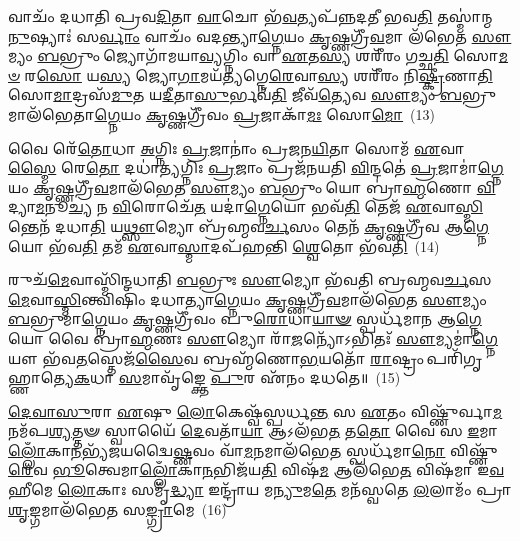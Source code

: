 𑌵𑌾𑌚𑌂᳴ 𑌦𑌧𑌾𑌤𑌿 𑌪𑍍𑌰𑌵\-\ul{𑌦𑌿}\-𑌤𑌾 \ul{𑌵𑌾}\-𑌚𑍋 𑌭᳴\-\ul{𑌵}\-𑌤𑍍𑌯𑌪᳴𑌨𑍍𑌨𑌦𑌤𑍀 𑌭𑌵\-\ul{𑌤𑌿} 𑌤𑌸𑍍𑌮𑌾॑𑌨𑍍𑌮\-\ul{𑌨𑍁}\-𑌷𑍍𑌯𑌾𑌃॑ 𑌸\-\ul{𑌰𑍍𑌵𑌾𑌂} 𑌵𑌾𑌚𑌂᳴ 𑌵𑌦𑌨𑍍𑌤𑍍𑌯𑌾\-\ul{𑌗𑍍𑌨𑍇}\-𑌯𑌂 \ul{𑌕𑍃}\-𑌷𑍍𑌣𑌗𑍍𑌰𑍀᳴\-\ul{𑌵}\-𑌮𑌾 𑌲᳴𑌭𑍇𑌤 \ul{𑌸𑍗}\-𑌮𑍍𑌯𑌂 \ul{𑌬}\-𑌭𑍍𑌰𑍁𑌂 𑌜𑍍𑌯𑍋𑌗𑌾᳴𑌮𑌯𑌾\-\ul{𑌵𑍍𑌯}\-𑌗𑍍𑌨𑌿𑌂 𑌵𑌾 \ul{𑌏}\-𑌤\-\ul{𑌸𑍍𑌯} 𑌶𑌰𑍀᳴𑌰𑌂 𑌗𑌚𑍍𑌛\-\ul{𑌤𑌿} 𑌸𑍋\-\ul{𑌮}\-\-\ul{𑍞} 𑌰\-\ul{𑌸𑍋} 𑌯\-\ul{𑌸𑍍𑌯} 𑌜𑍍𑌯𑍋\-\ul{𑌗𑌾}\-𑌮𑌯᳴\-\ul{𑌤𑍍𑌯}\-𑌗𑍍𑌨𑍇\-\ul{𑌰𑍇}\-𑌵𑌾\-\ul{𑌸𑍍𑌯} 𑌶𑌰𑍀᳴𑌰𑌂 𑌨𑌿\-\ul{𑌷𑍍𑌕𑍍𑌰𑍀}\-𑌣𑌾\-\ul{𑌤𑌿} 𑌸𑍋\-\ul{𑌮𑌾}\-𑌦𑍍𑌰𑌸᳴\-\ul{𑌮𑍁}\-𑌤 𑌯\-\ul{𑌦𑍀}\-𑌤𑌾\-\ul{𑌸𑍁}\-𑌰𑍍𑌭𑌵᳴\-\ul{𑌤𑌿} 𑌜𑍀𑌵᳴\-\ul{𑌤𑍍𑌯𑍇}\-𑌵 \ul{𑌸𑍗}\-𑌮𑍍𑌯𑌂 \ul{𑌬}\-𑌭𑍍𑌰𑍁𑌮𑌾𑌲᳴𑌭𑍇𑌤𑌾\-\ul{𑌗𑍍𑌨𑍇}\-𑌯𑌂 \ul{𑌕𑍃}\-𑌷𑍍𑌣𑌗𑍍𑌰𑍀᳴𑌵𑌂 \ul{𑌪𑍍𑌰}\-𑌜𑌾𑌕𑌾᳴\-\ul{𑌮𑌃} 𑌸𑍋\-\ul{𑌮𑍋}\-~(13)

𑌵𑍈 𑌰𑍇᳴\-\ul{𑌤𑍋}\-𑌧𑌾 \ul{𑌅}\-𑌗𑍍𑌨𑌿𑌃 \ul{𑌪𑍍𑌰}\-𑌜𑌾𑌨𑌾𑌂॑ 𑌪𑍍𑌰𑌜𑌨\-\ul{𑌯𑌿}\-𑌤𑌾 𑌸𑍋𑌮᳴ \ul{𑌏}\-𑌵𑌾\-\ul{𑌸𑍍𑌮𑍈} 𑌰𑍇\-\ul{𑌤𑍋} 𑌦𑌧𑌾॑\-\ul{𑌤𑍍𑌯}\-𑌗𑍍𑌨𑌿𑌃 \ul{𑌪𑍍𑌰}\-𑌜𑌾𑌂 𑌪𑍍𑌰𑌜᳴𑌨𑌯𑌤𑌿 \ul{𑌵𑌿}\-𑌨𑍍𑌦𑌤𑍇॑ \ul{𑌪𑍍𑌰}\-𑌜𑌾𑌮𑌾॑\-\ul{𑌗𑍍𑌨𑍇}\-𑌯𑌂 \ul{𑌕𑍃}\-𑌷𑍍𑌣\-𑌗𑍍𑌰𑍀᳴\-\ul{𑌵}\-𑌮𑌾𑌲᳴𑌭𑍇𑌤 \ul{𑌸𑍗}\-𑌮𑍍𑌯𑌂 \ul{𑌬}\-𑌭𑍍𑌰𑍁𑌂 𑌯𑍋 𑌬𑍍𑌰𑌾॑\-\ul{𑌹𑍍𑌮}\-𑌣𑍋 \ul{𑌵𑌿}\-𑌦𑍍𑌯𑌾\-\ul{𑌮}\-𑌨𑍂\-\ul{𑌚𑍍𑌯} 𑌨 \ul{𑌵𑌿}\-𑌰𑍋𑌚𑍇᳴\-\ul{𑌤} 𑌯𑌦𑌾॑\-\ul{𑌗𑍍𑌨𑍇}\-𑌯𑍋 𑌭𑌵᳴\-\ul{𑌤𑌿} 𑌤𑍇𑌜᳴ \ul{𑌏}\-𑌵𑌾\-\ul{𑌸𑍍𑌮𑌿}\-𑌨𑍍𑌤𑍇𑌨᳴ 𑌦𑌧𑌾\-\ul{𑌤𑌿} 𑌯\-\ul{𑌥𑍍𑌸𑍗}\-𑌮𑍍𑌯𑍋 𑌬𑍍𑌰᳴𑌹𑍍𑌮𑌵\-\ul{𑌰𑍍𑌚}\-𑌸𑌂 𑌤𑍇𑌨᳴ \ul{𑌕𑍃}\-𑌷𑍍𑌣𑌗𑍍𑌰𑍀᳴𑌵 𑌆\-\ul{𑌗𑍍𑌨𑍇}\-𑌯𑍋 𑌭᳴𑌵\-\ul{𑌤𑌿} 𑌤𑌮᳴ \ul{𑌏}\-𑌵𑌾\-\ul{𑌸𑍍𑌮𑌾}\-𑌦𑌪᳴𑌹𑌨𑍍𑌤𑌿 \ul{𑌶𑍍𑌵𑍇}\-𑌤𑍋 𑌭᳴𑌵\-\ul{𑌤𑌿}\-~(14)

𑌰𑍁𑌚᳴\-\ul{𑌮𑍇}\-𑌵𑌾𑌸𑍍𑌮𑌿᳴𑌨𑍍𑌦𑌧𑌾𑌤𑌿 \ul{𑌬}\-𑌭𑍍𑌰𑍁𑌃 \ul{𑌸𑍗}\-𑌮𑍍𑌯𑍋 𑌭᳴𑌵𑌤𑌿 𑌬𑍍𑌰𑌹𑍍𑌮𑌵\-\ul{𑌰𑍍𑌚}\-𑌸\-\-\ul{𑌮𑍇}\-𑌵𑌾\-\ul{𑌸𑍍𑌮𑌿}\-𑌨𑍍𑌤𑍍𑌵𑌿𑌷𑌿𑌂᳴ 𑌦𑌧𑌾𑌤𑍍𑌯𑌾\-\ul{𑌗𑍍𑌨𑍇}\-𑌯𑌂 \ul{𑌕𑍃}\-𑌷𑍍𑌣𑌗𑍍𑌰𑍀᳴\-\ul{𑌵}\-𑌮𑌾𑌲᳴𑌭𑍇𑌤 \ul{𑌸𑍗}\-𑌮𑍍𑌯𑌂 \ul{𑌬}\-𑌭𑍍𑌰𑍁𑌮𑌾॑\-\ul{𑌗𑍍𑌨𑍇}\-𑌯𑌂 \ul{𑌕𑍃}\-𑌷𑍍𑌣𑌗𑍍𑌰𑍀᳴𑌵𑌂 𑌪𑍁\-\ul{𑌰𑍋}\-𑌧𑌾\-\ul{𑌯𑌾}\-\-\ul{𑍟} 𑌸𑍍𑌪𑌰𑍍𑌧᳴𑌮𑌾𑌨 𑌆\-\ul{𑌗𑍍𑌨𑍇}\-𑌯𑍋 𑌵𑍈 𑌬𑍍𑌰𑌾॑\-\ul{𑌹𑍍𑌮}\-𑌣𑌃 \ul{𑌸𑍗}\-𑌮𑍍𑌯𑍋 𑌰𑌾᳴\-\ul{𑌜}\-𑌨𑍍𑌯𑍋᳴\-𑌽𑌭𑌿𑌤𑌃᳴ \ul{𑌸𑍗}\-𑌮𑍍𑌯𑌮𑌾॑\-\ul{𑌗𑍍𑌨𑍇}\-𑌯𑍗 𑌭᳴𑌵\-\ul{𑌤}\-𑌸𑍍𑌤𑍇𑌜᳴\-\ul{𑌸𑍈}\-𑌵 𑌬𑍍𑌰𑌹𑍍𑌮᳴𑌣𑍋\-\ul{𑌭}\-𑌯𑌤𑍋᳴ \ul{𑌰𑌾}\-𑌷𑍍𑌟𑍍𑌰𑌂 𑌪𑌰𑌿᳴\-𑌗𑍃𑌹𑍍𑌣𑌾𑌤𑍍𑌯𑍇\-\ul{𑌕}\-𑌧𑌾 \ul{𑌸}\-𑌮𑌾𑌵𑍃᳴𑌙𑍍𑌕𑍍𑌤𑍇 \ul{𑌪𑍁}\-𑌰 𑌏᳴𑌨𑌂 𑌦𑌧𑌤𑍇॥~(15)

{}

\-\ul{𑌦𑍇}\-\-\ul{𑌵𑌾}\-\-\ul{𑌸𑍁}\-𑌰𑌾 \ul{𑌏}\-𑌷𑍁 \ul{𑌲𑍋}\-𑌕𑍇𑌷𑍍𑌵᳴𑌸𑍍𑌪𑌰𑍍𑌧\-\ul{𑌨𑍍𑌤} 𑌸 \ul{𑌏}\-𑌤𑌂 𑌵𑌿𑌷𑍍𑌣𑍁᳴𑌰𑍍𑌵𑌾\-\ul{𑌮}\-𑌨𑌮᳴\-𑌪\-\ul{𑌶𑍍𑌯}\-𑌤𑍍𑌤𑍟 𑌸𑍍𑌵𑌾𑌯𑍈᳴ \ul{𑌦𑍇}\-𑌵𑌤𑌾᳴\-\ul{𑌯𑌾} 𑌆\-𑌽𑌲᳴𑌭\-\ul{𑌤} 𑌤\-\ul{𑌤𑍋} 𑌵𑍈 𑌸 \ul{𑌇}\-𑌮𑌾\-\ul{𑌲𑍍𑌲𑍋𑌁}\-𑌕𑌾\-\ul{𑌨}\-𑌭𑍍𑌯᳴\-𑌜𑌯𑌦𑍍𑌵𑍈\-\ul{𑌷𑍍𑌣}\-𑌵𑌂 𑌵𑌾᳴\-\ul{𑌮}\-𑌨𑌮𑌾\-𑌲᳴𑌭𑍇\-\ul{𑌤} 𑌸𑍍𑌪𑌰𑍍𑌧᳴𑌮𑌾\-\ul{𑌨𑍋} 𑌵𑌿𑌷𑍍𑌣𑍁᳴\-\ul{𑌰𑍇}\-𑌵 \ul{𑌭𑍂}\-𑌤𑍍𑌵𑍇𑌮𑌾\-\ul{𑌲𑍍𑌲𑍋𑌁}\-𑌕𑌾\-\ul{𑌨}\-𑌭𑌿𑌜᳴𑌯\-\ul{𑌤𑌿} 𑌵𑌿𑌷᳴\-\ul{𑌮} 𑌆\-𑌲᳴𑌭𑍇\-\ul{𑌤} 𑌵𑌿𑌷᳴𑌮𑌾 𑌇\-\ul{𑌵} 𑌹𑍀𑌮𑍇 \ul{𑌲𑍋}\-𑌕𑌾𑌃 𑌸𑌮𑍃᳴\-\ul{𑌦𑍍𑌧𑍍𑌯𑌾} 𑌇𑌨𑍍𑌦𑍍𑌰𑌾᳴𑌯 𑌮\-\ul{𑌨𑍍𑌯𑍁}\-𑌮\-\ul{𑌤𑍇} 𑌮𑌨᳴𑌸𑍍𑌵𑌤𑍇 \ul{𑌲}\-𑌲𑌾𑌮𑌂᳴ 𑌪𑍍𑌰𑌾\-\ul{𑌶𑍃}\-𑌙𑍍𑌗𑌮𑌾𑌲᳴𑌭𑍇𑌤 𑌸\-\ul{𑌙𑍍𑌗𑍍𑌰𑌾}\-𑌮𑍇~(16)

